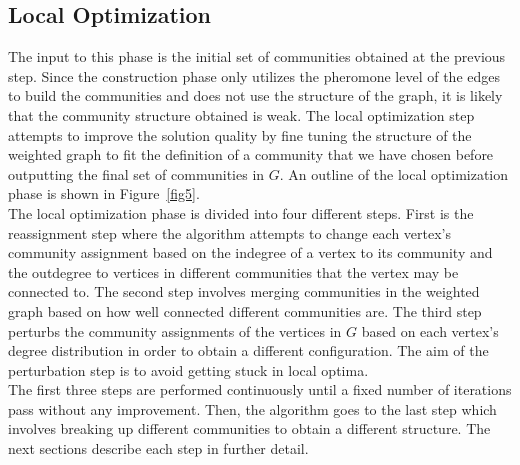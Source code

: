 \begin{spacing}{1.5}
\section{Local Optimization}
The input to this phase is the initial set of communities obtained at the previous step. Since the construction phase only utilizes the pheromone level of the edges to build the communities and does not use the structure of the graph, it is likely that the community structure obtained is weak. The local optimization step attempts to improve the solution quality by fine tuning the structure of the weighted graph to fit the definition of a community that we have chosen before outputting the final set of communities in $G$. An outline of the local optimization phase is shown in Figure~\ref{fig5}.\\
\indent The local optimization phase is divided into four different steps. First is the reassignment step where the algorithm attempts to change each vertex's community assignment based on the indegree of a vertex to its community and the outdegree to vertices in different communities that the vertex may be connected to. The second step involves merging communities in the weighted graph based on how well connected different communities are. The third step perturbs the community assignments of the vertices in $G$ based on each vertex's degree distribution in order to obtain a different configuration. The aim of the perturbation step is to avoid getting stuck in local optima.\\
\indent The first three steps are performed continuously until a fixed number of iterations pass without any improvement. Then, the algorithm goes to the last step which involves breaking up different communities to obtain a different structure. The next sections describe each step in further detail. 

\end{spacing}
